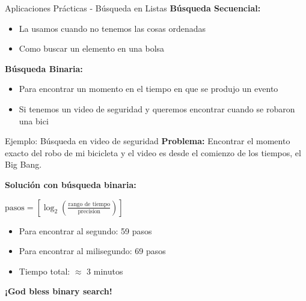 \documentclass{beamer}
\begin{document}
\begin{frame}{Aplicaciones Prácticas - Búsqueda en Listas}
    \textbf{Búsqueda Secuencial:}
    \begin{itemize}
        \item La usamos cuando no tenemos las cosas ordenadas
        \item Como buscar un elemento en una bolsa
    \end{itemize}
    
    \vspace{0.3cm}
    
    \textbf{Búsqueda Binaria:}
    \begin{itemize}
        \item Para encontrar un momento en el tiempo en que se produjo un evento
        \item Si tenemos un video de seguridad y queremos encontrar cuando se robaron una bici
    \end{itemize}
\end{frame}

\begin{frame}{Ejemplo: Búsqueda en video de seguridad}
    \textbf{Problema:} Encontrar el momento exacto del robo de mi bicicleta y el video es desde el comienzo de los tiempos, el Big Bang.
    
    \vspace{0.5cm}
    
    \textbf{Solución con búsqueda binaria:}
    \begin{center}
        $\text{pasos} = \left[ \log_2 \left( \frac{\text{rango de tiempo}}{\text{precision}} \right) \right]$
    \end{center}
    
    \vspace{0.3cm}
    
    \begin{itemize}
        \item Para encontrar al segundo: 59 pasos
        \item Para encontrar al milisegundo: 69 pasos
        \item Tiempo total: $\approx$ 3 minutos
    \end{itemize}
    
    \vspace{0.5cm}
    
    \begin{center}
        \textbf{¡God bless binary search!}
    \end{center}
\end{frame}
\end{document}
